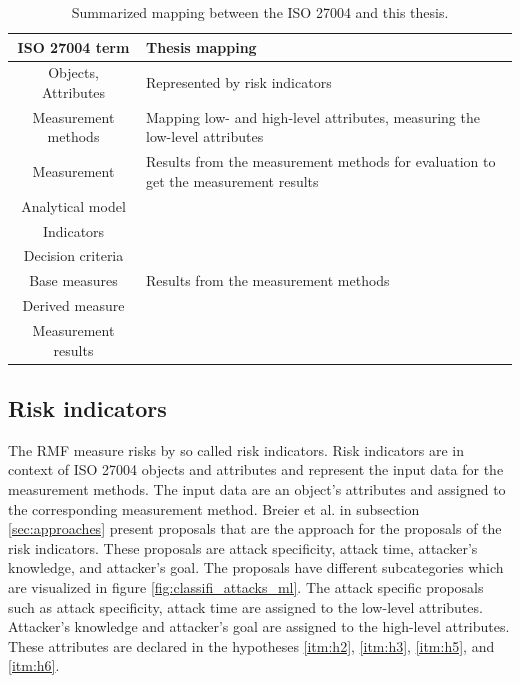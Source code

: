 \begin{table}[h!]
\centering
  \begin{tabular}{| c | p{10cm} |}
  \hline
  \rowcolor{lightgray} ISO 27004 term & Thesis mapping \\ [0.5ex]
  \hline
  Objects, Attributes & Represented by risk indicators \\
  \hline
  Measurement methods & Mapping low- and high-level attributes, measuring the low-level attributes \\
  \hline
  Measurement & Results from the measurement methods for evaluation to get the measurement results \\
  \hline
  Analytical model & \\
  \hline
  Indicators & \\
  \hline
  Decision criteria & \\
  \hline
  Base measures & Results from the measurement methods \\
  \hline
  Derived measure & \\
  \hline
  Measurement results & \\
  \hline
  \end{tabular}
\caption{Summarized mapping between the ISO 27004 and this thesis.}
\label{tab:iso_table}
\end{table}

\subsection{Risk indicators}
\label{sec:risk_indicators}

The RMF measure risks by so called risk indicators. Risk indicators are in context of ISO 27004 \cite{ISO_27004_2009} objects and attributes and represent the input data for the measurement methods. The input data are an object's attributes and assigned to the corresponding measurement method. Breier et al. \cite{DBLP:journals/corr/abs-2012-04884} in subsection \ref{sec:approaches} present
proposals that are the approach for the proposals of the risk indicators. These proposals are attack specificity, attack time, attacker's knowledge, and attacker's goal. The proposals have different subcategories which are visualized in figure \ref{fig:classifi_attacks_ml}. The attack specific proposals such as attack specificity, attack time are assigned to the low-level attributes. Attacker's knowledge and attacker's goal are assigned to the high-level attributes. These attributes are declared in the hypotheses \ref{itm:h2}, \ref{itm:h3}, \ref{itm:h5}, and \ref{itm:h6}.

